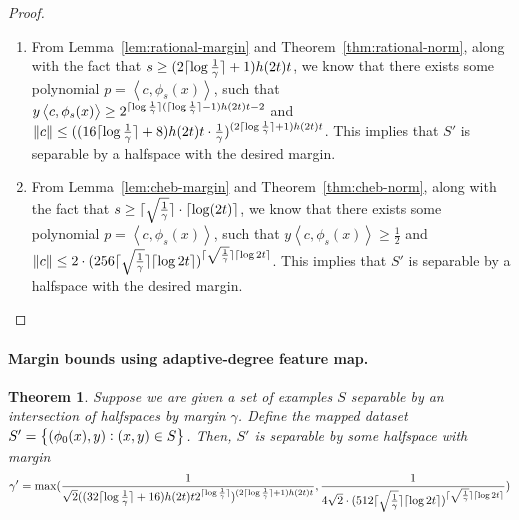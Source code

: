\documentclass{article}
\DeclarePairedDelimiter\ceil{\lceil}{\rceil}
\newcommand{\inner}[1]{ \left\langle {#1} \right\rangle }
\newtheorem{theorem}{Theorem}
\begin{document}
\begin{proof}
\begin{enumerate}
\item From Lemma~\ref{lem:rational-margin} and Theorem~\ref{thm:rational-norm}, 
along with the fact that $s \geq (2\ceil{\log \frac 1 \gamma}+1) h(2t) t$,
we know that there exists some polynomial $p = \inner{c, \phi_s(x)}$, such that
$y \inner{c, \phi_s(x)} \geq  2^{\ceil{\log \frac 1 \gamma}(\ceil{\log \frac 1 \gamma}-1)h(2t)t - 2}$ and 
$\|c\| \leq ((16\ceil{\log \frac 1 \gamma}+8) h(2t) t \cdot \frac 1 \gamma)^{(2\ceil{\log \frac 1 \gamma}+1)h(2t)t}$. This implies that $S'$ is separable by a halfspace with the desired margin.

\item From Lemma~\ref{lem:cheb-margin} and Theorem~\ref{thm:cheb-norm},
along with the fact that $s \geq \ceil{\sqrt{\frac1\gamma}} \cdot \ceil{\log(2t)}$, we know that there exists some polynomial $p = \inner{c, \phi_s(x)}$, such that
$y \inner{c, \phi_s(x)} \geq \frac 1 2$ and
$\| c \| \leq 2 \cdot (256 \ceil{\sqrt{\frac1\gamma}} \ceil{\log 2t})^{\ceil{\sqrt{\frac1\gamma}} \ceil{\log 2t}}$. This implies that $S'$ is separable by a halfspace with the desired margin.
\end{enumerate}
\end{proof}


\paragraph{Margin bounds using adaptive-degree feature map.}
\begin{theorem}
Suppose we are given a set of examples $S$ separable by an intersection of halfspaces by margin $\gamma$. Define the mapped dataset $S'=\cbr{(\phi_0(x),y): (x,y) \in S}$. Then, $S'$ is separable by some halfspace with margin
\[
\gamma' =
\max(
\frac{1}{ \sqrt{2} ( (32 \ceil{\log \frac 1 \gamma} + 16 ) h(2t) t 2^{\ceil{\log \frac 1 \gamma}})^{(2\ceil{\log \frac 1 \gamma} + 1 ) h(2t) t} },
\frac{1}{4 \sqrt{2} \cdot (512 \ceil{\sqrt{\frac1\gamma}} \ceil{\log 2t})^{\ceil{\sqrt{\frac1\gamma}} \ceil{\log 2t}}}
)
\]
\end{theorem}
\end{document}
